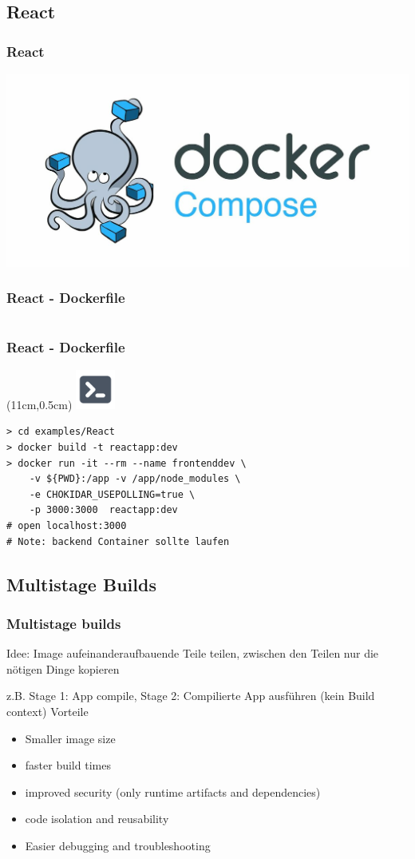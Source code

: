 \documentclass[22pt]{beamer}
\newcommand{\terminal}{
    \begin{textblock*}{1.3cm}(11cm,0.5cm) %
    \includegraphics[width=1.3cm]{Bilder/terminal.png}
    \end{textblock*}
}
\begin{document}
\subsection{React}
\begin{frame}[t]
    \frametitle{React}
    \includegraphics{Bilder/1200px-Docker-compose-logo.jpg}

\end{frame}

\begin{frame}[fragile]
    \frametitle{React - Dockerfile}
    \inputminted[fontsize=\footnotesize, frame=lines]{dockerfile}{../examples/React/Dockerfile}
\end{frame}

\begin{frame}[fragile]
    \frametitle{React - Dockerfile}
    \terminal
\begin{verbatim}
> cd examples/React
> docker build -t reactapp:dev
> docker run -it --rm --name frontenddev \
    -v ${PWD}:/app -v /app/node_modules \
    -e CHOKIDAR_USEPOLLING=true \
    -p 3000:3000  reactapp:dev
# open localhost:3000
# Note: backend Container sollte laufen
\end{verbatim}
\end{frame}

\subsection{Multistage Builds}
\begin{frame}[t]
    \frametitle{Multistage builds}
    Idee: Image aufeinanderaufbauende Teile teilen, zwischen den Teilen nur die nötigen Dinge kopieren

    z.B. Stage 1: App compile, Stage 2: Compilierte App ausführen (kein Build context) 
    Vorteile
    \begin{itemize}
        \item Smaller image size
        \item faster build times
        \item improved security (only runtime artifacts and dependencies)
        \item code isolation and reusability
        \item Easier debugging and troubleshooting
    \end{itemize} 
\end{frame}
\end{document}
